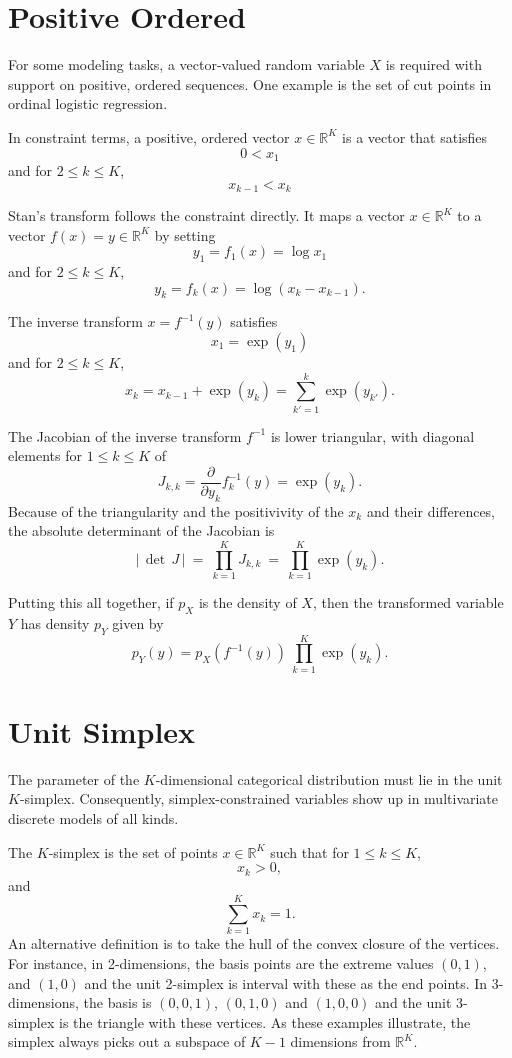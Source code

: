 \documentclass[10pt]{report}
\newcommand{\Stan}{Stan\xspace}
\begin{document}
\section{Positive Ordered}

For some modeling tasks, a vector-valued random variable $X$ is
required with support on positive, ordered sequences.  One example is
the set of cut points in ordinal logistic regression.  

In constraint terms, a positive, ordered vector $x \in \mathbb{R}^K$
is a vector that satisfies
\[
0 < x_1
\]
%
and for $2 \leq k \leq K$,
\[
x_{k-1} < x_k
\]
%

\Stan's transform follows the constraint directly.  It maps a vector
$x \in \mathbb{R}^{K}$ to a vector $f(x) = y \in \mathbb{R}^K$ by setting
%
\[
y_1 = f_1(x) = \log x_1
\] 
%
and for $2 \leq k \leq K$,
\[
y_k = f_k(x) = \log \left( x_{k} - x_{k-1} \right).
\]

The inverse transform $x = f^{-1}(y)$ satisfies
%
\[
x_1 = \exp(y_1)
\]
%
and for $2 \leq k \leq K$, 
\[
x_k = x_{k-1} + \exp(y_k) = \sum_{k' =1}^{k} \exp(y_{k'}).
\]

The Jacobian of the inverse transform $f^{-1}$ is lower triangular,
with diagonal elements for $1 \leq k \leq K$ of
\[
J_{k,k} = \frac{\partial}{\partial y_k} f_k^{-1}(y) = \exp(y_k).
\]
%
Because of the triangularity and the positivivity of the $x_k$ and
their differences, the absolute determinant of the Jacobian is
%
\[
\left| \, \det \, J \, \right|
\ = \ 
\prod_{k=1}^K J_{k,k}
\ = \ 
\prod_{k=1}^K \exp(y_k).
\]


Putting this all together, if $p_X$ is the density of $X$, then the
transformed variable $Y$ has density $p_Y$ given by
%
\[
p_Y(y)
= p_X(f^{-1}(y)) 
\
\prod_{k=1}^K \exp(y_k).
\]


\section{Unit Simplex}

The parameter of the $K$-dimensional categorical distribution must lie
in the unit $K$-simplex.  Consequently, simplex-constrained variables show
up in multivariate discrete models of all kinds.  

The $K$-simplex is the set of points $x \in \mathbb{R}^K$ such that
for $1 \leq k \leq K$, 
\[ 
x_k > 0,
\] 
and
\[
\sum_{k=1}^K x_k = 1.
\]
%   
An alternative definition is to take the hull of the convex closure of
the vertices.  For instance, in 2-dimensions, the basis points are the
extreme values $(0,1)$, and $(1,0)$ and the unit 2-simplex is interval
with these as the end points.  In 3-dimensions, the basis is
$(0,0,1)$, $(0,1,0)$ and $(1,0,0)$ and the unit 3-simplex is the
triangle with these vertices.  As these examples illustrate, the
simplex always picks out a subspace of $K-1$ dimensions from
$\mathbb{R}^K$.
\end{document}
